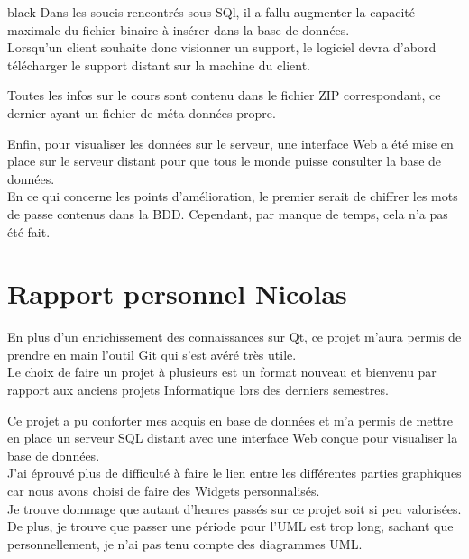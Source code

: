 \begin{items}{black}{\Bullet}
Dans les soucis rencontrés sous SQl, il a fallu augmenter la capacité maximale du fichier binaire à insérer dans la base de données.\\

Lorsqu’un client souhaite donc visionner un support, le logiciel devra d’abord télécharger le support distant sur la machine du client.

Toutes les infos sur le cours sont contenu dans le fichier ZIP correspondant, ce dernier ayant un fichier de méta données propre.


Enfin, pour visualiser les données sur le serveur, une interface Web a été mise en place sur le serveur distant pour que tous le monde puisse consulter la base de données.\\

En ce qui concerne les points d'amélioration, le premier serait de chiffrer les mots de passe contenus dans la BDD. Cependant, par manque de temps, cela n'a pas été fait.



\section{Rapport personnel Nicolas}

En plus d'un enrichissement des connaissances sur Qt, ce projet m'aura permis de prendre en main l'outil Git qui s'est avéré très utile.\\

Le choix de faire un projet à plusieurs est un format nouveau et bienvenu 
par rapport aux anciens projets Informatique lors des derniers semestres.

Ce projet a pu conforter mes acquis en base de données et m'a permis de mettre en place un serveur SQL distant avec une interface Web conçue pour visualiser la base de données. \\

J'ai éprouvé plus de difficulté à faire le lien entre les différentes parties graphiques car nous avons choisi de faire des Widgets personnalisés.\\

Je trouve dommage que autant d'heures passés sur ce projet soit si peu valorisées.\\
De plus, je trouve que passer une période pour l'UML est trop long, sachant que personnellement, je n'ai pas tenu compte des diagrammes UML.\\






\end{items}
